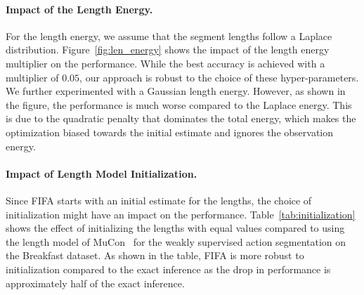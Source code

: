 \paragraph{Impact of the Length Energy.}
For the length energy, we assume that the segment lengths follow a Laplace distribution. Figure~\ref{fig:len_energy} shows the impact of the length energy multiplier on the performance. While the best accuracy is achieved with a multiplier of $0.05$, our approach is robust to the choice of these hyper-parameters. We further experimented with a Gaussian length energy. However, as shown in the figure, the performance is much worse compared to the Laplace energy. This is due to the quadratic penalty that dominates the total energy, which makes the optimization biased towards the initial estimate and ignores the observation energy.  




\paragraph{Impact of Length Model Initialization.}
Since FIFA starts with an initial estimate for the lengths, the choice of initialization might have an impact on the performance. Table~\ref{tab:initialization} shows the effect of initializing the lengths with equal values compared to using the length model of MuCon~\cite{mucon} for the weakly supervised action segmentation on the Breakfast dataset. As shown in the table, FIFA is more robust to initialization compared to the exact inference as the drop in performance is approximately half of the exact inference.

\begin{table}[tb]
   \centering
   \caption{Impact of the Length Model initialization for MuCon using exact inference and FIFA for weakly supervised action segmentation on the Breakfast dataset.}
   \label{tab:initialization}
\end{table}



